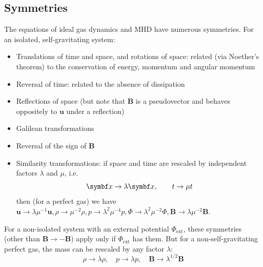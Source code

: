\documentclass{jknotes}
\newcommand{\B}{\symbf{B}}
\renewcommand{\u}{\symbf{u}}
\begin{document}
\subsection{Symmetries}
The equations of ideal gas dynamics and MHD have numerous symmetries. For an
isolated, self-gravitating system:
\begin{itemize}
	\item Translations of time and space, and rotations of space: related (via
		Noether's theorem) to the conservation of energy, momentum and angular
		momentum
	\item Reversal of time: related to the absence of dissipation
	\item Reflections of space (but note that $\B$ is a pseudovector and
		behaves oppositely to $\u$ under a reflection)
	\item Galilean transformations
	\item Reversal of the sign of $\B$
	\item Similarity transformations: if space and time are rescaled by
		independent factors $\lambda$ and $\mu$, i.e.
		\begin{equation}
			\x \to \lambda \x, \hspace{2em} t \to \mu t
		\end{equation}
		then (for a perfect gas) we have $\u \to \lambda \mu^{-1}\u, \rho \to
		\mu^{-2}\rho, p \to \lambda^2 \mu^{-4} p, \Phi \to \lambda^2 \mu^{-2}
		\Phi, \B \to \lambda \mu^{-2}\B$. 
\end{itemize}

For a non-isolated system with an external potential $\Phi_{\text{ext}}$,
these symmetries (other than $\B \to -\B$) apply only if $\Phi_{\text{ext}}$
has them. But for a non-self-gravitating perfect gas, the mass can be rescaled
by any factor $\lambda$:
\begin{equation}
	\rho \to \lambda \rho, \hspace{1em} p \to \lambda p, \hspace{1em} \B \to
	\lambda^{1/2}\B
\end{equation}
\end{document}
